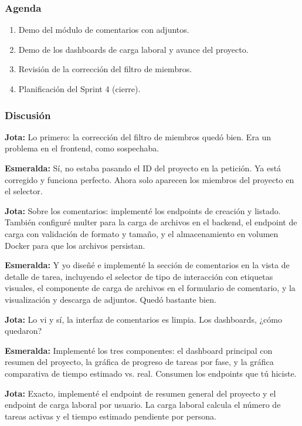 \documentclass[12pt, a4paper]{article}
\newcommand{\jota}[1]{\noindent\textbf{\color{primary}Jota:} #1\par\smallskip}
\newcommand{\esme}[1]{\noindent\textbf{\color{accentgreen}Esmeralda:} #1\par\smallskip}
\begin{document}
\subsubsection*{Agenda}
\begin{enumerate}[leftmargin=1.5em]
  \item Demo del módulo de comentarios con adjuntos.
  \item Demo de los dashboards de carga laboral y avance del proyecto.
  \item Revisión de la corrección del filtro de miembros.
  \item Planificación del Sprint 4 (cierre).
\end{enumerate}

\subsubsection*{Discusión}

\jota{Lo primero: la corrección del filtro de miembros quedó bien. Era un problema en el frontend, como sospechaba.}

\esme{Sí, no estaba pasando el ID del proyecto en la petición. Ya está corregido y funciona perfecto. Ahora solo aparecen los miembros del proyecto en el selector.}

\jota{Sobre los comentarios: implementé los endpoints de creación y listado. También configuré multer para la carga de archivos en el backend, el endpoint de carga con validación de formato y tamaño, y el almacenamiento en volumen Docker para que los archivos persistan.}

\esme{Y yo diseñé e implementé la sección de comentarios en la vista de detalle de tarea, incluyendo el selector de tipo de interacción con etiquetas visuales, el componente de carga de archivos en el formulario de comentario, y la visualización y descarga de adjuntos. Quedó bastante bien.}

\jota{Lo vi y sí, la interfaz de comentarios es limpia. Los dashboards, ¿cómo quedaron?}

\esme{Implementé los tres componentes: el dashboard principal con resumen del proyecto, la gráfica de progreso de tareas por fase, y la gráfica comparativa de tiempo estimado vs. real. Consumen los endpoints que tú hiciste.}

\jota{Exacto, implementé el endpoint de resumen general del proyecto y el endpoint de carga laboral por usuario. La carga laboral calcula el número de tareas activas y el tiempo estimado pendiente por persona.}
\end{document}
